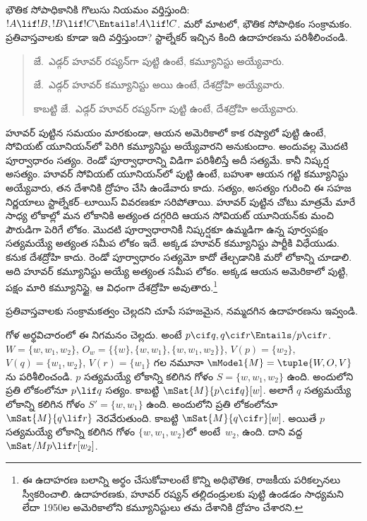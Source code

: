 \documentclass[../../../include/open-logic-section]{subfiles}
\begin{document}


భౌతిక సోపాధికానికి గొలుసు నియమం
వర్తిస్తుంది: $!A \lif !B, !B
\lif !C \Entails !A \lif !C$.
మరో మాటలో, భౌతిక సోపాధికం
సంక్రామకం. ప్రతివాస్తవాలకు కూడా
ఇది వర్తిస్తుందా? స్టాల్నేకర్
ఇచ్చిన కింది ఉదాహరణను పరిశీలించండి.
\begin{quote}
  జే.~ఎడ్గర్ హూవర్ రష్యన్‌గా పుట్టి
  ఉంటే, కమ్యూనిస్టు అయ్యేవారు.

  జే.~ఎడ్గర్ హూవర్ కమ్యూనిస్టు అయి
  ఉంటే, దేశద్రోహి అయ్యేవారు.

  కాబట్టి జే.~ఎడ్గర్ హూవర్ రష్యన్‌గా
  పుట్టి ఉంటే, దేశద్రోహి అయ్యేవారు.
\end{quote}
హూవర్ పుట్టిన సమయం మారకుండా, ఆయన అమెరికాలో కాక రష్యాలో
పుట్టి ఉంటే, సోవియట్ యూనియన్‌లో పెరిగి కమ్యూనిస్టు
అయ్యేవారని అనుకుందాం. అందువల్ల మొదటి పూర్వాధారం సత్యం.
రెండో పూర్వాధారాన్ని విడిగా పరిశీలిస్తే అదీ సత్యమే.
కానీ నిష్కర్ష అసత్యం. హూవర్ సోవియట్ యూనియన్‌లో పుట్టి ఉంటే, బహుశా
ఆయన గట్టి కమ్యూనిస్టు అయ్యేవారు, తన దేశానికి ద్రోహం చేసి
ఉండేవారు కాదు. సత్యం, అసత్యం గురించి ఈ సహజ నిర్ణయాలు
స్టాల్నేకర్--లూయిస్ వివరణకూ సరిపోతాయి. హూవర్ పుట్టిన చోటు
మాత్రమే మారే సాధ్య లోకాల్లో మన లోకానికి అత్యంత దగ్గరిది
ఆయన సోవియట్ యూనియన్‌కు మంచి పౌరుడిగా పెరిగే లోకం.
మొదటి పూర్వాధారానికీ నిష్కర్షకూ ఉమ్మడిగా ఉన్న పూర్వపక్షం సత్యమయ్యే
అత్యంత సమీప లోకం ఇదే. అక్కడ హూవర్ కమ్యూనిస్టు పార్టీకి
విధేయుడు. కనుక దేశద్రోహి కాదు. రెండో పూర్వాధారం సత్యమో కాదో తేల్చడానికి
మరో లోకాన్ని చూడాలి. అది హూవర్ కమ్యూనిస్టు అయ్యే అత్యంత సమీప
లోకం. అక్కడ ఆయన అమెరికాలో పుట్టి, పక్షం మారి కమ్యూనిస్టై,
ఆ విధంగా దేశద్రోహి అవుతారు.\footnote{ఈ
  ఉదాహరణ బలాన్ని అర్థం చేసుకోవాలంటే
  కొన్ని అధిభౌతిక, రాజకీయ
  పరికల్పనలు స్వీకరించాలి. ఉదాహరణకు,
  హూవర్ రష్యన్ తల్లిదండ్రులకు
  పుట్టి ఉండడం సాధ్యమని లేదా
  1950ల అమెరికాలోని కమ్యూనిస్టులు
  తమ దేశానికి ద్రోహం చేశారని.}

\begin{prob}
  ప్రతివాస్తవాలకు సంక్రామకత్వం చెల్లదని చూపే సహజమైన,
  నమ్మదగిన ఉదాహరణను ఇవ్వండి.
\end{prob}

\begin{ex}
  గోళ అర్థవిచారంలో ఈ నిగమనం
  చెల్లదు. అంటే $p
  \cif q, q \cif r \Entails/ p \cif r$.
  $W = \{w, w_1, w_2\}$,
  $O_w = \{\{w\}, \{w,
  w_1\}, \{w, w_1, w_2\}\}$,
  $V(p) = \{w_2\}$,
  $V(q) = \{w_1, w_2\}$,
  $V(r) = \{w_1\}$
  గల నమూనా $\mModel{M}
  = \tuple{W, O, V}$ను
  పరిశీలించండి. $p$ సత్యమయ్యే
  లోకాన్ని కలిగిన గోళం
  $S = \{w, w_1,
  w_2\}$ ఉంది. అందులోని
  ప్రతి లోకంలోనూ
  $p \lif q$ సత్యం.
  కాబట్టి $\mSat{M}{p
    \cif q}[w]$. అలాగే
  $q$ సత్యమయ్యే లోకాన్ని
  కలిగిన గోళం $S' = \{w,
  w_1\}$ ఉంది. అందులోని
  ప్రతి లోకంలోనూ
  $\mSat{M}{q \lif r}$ నెరవేరుతుంది.
  కాబట్టి $\mSat{M}{q \cif r}[w]$.
  అయితే $p$ సత్యమయ్యే లోకాన్ని కలిగిన
  గోళం $\{w,
  w_1, w_2\}$లో
  అంటే~$w_2$, ఉంది.
  దాని వద్ద $\mSat/{M}{p \lif
    r}[w_2]$.
\end{ex}
\end{document}
